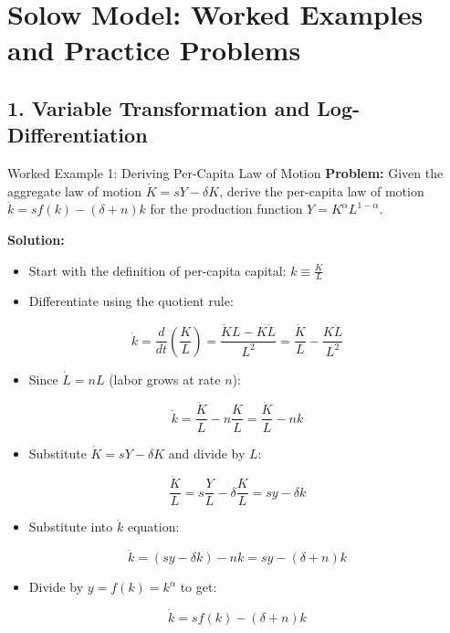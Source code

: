 \section{Solow Model: Worked Examples and Practice Problems}

\subsection{1. Variable Transformation and Log-Differentiation}

\begin{frame}{Worked Example 1: Deriving Per-Capita Law of Motion}
\textbf{Problem:} Given the aggregate law of motion $\dot{K} = sY - \delta K$, derive the per-capita law of motion $\dot{k} = sf(k) - (\delta + n)k$ for the production function $Y = K^\alpha L^{1-\alpha}$.

\bigskip
\textbf{Solution:}

\begin{itemize}
\item Start with the definition of per-capita capital: $k \equiv \frac{K}{L}$
\item Differentiate using the quotient rule:
\end{itemize}

\[
\dot{k} = \frac{d}{dt}\left(\frac{K}{L}\right) = \frac{\dot{K}L - K\dot{L}}{L^2} = \frac{\dot{K}}{L} - \frac{K\dot{L}}{L^2}
\]

\begin{itemize}
\item Since $\dot{L} = nL$ (labor grows at rate $n$):
\end{itemize}

\[
\dot{k} = \frac{\dot{K}}{L} - n\frac{K}{L} = \frac{\dot{K}}{L} - nk
\]

\begin{itemize}
\item Substitute $\dot{K} = sY - \delta K$ and divide by $L$:
\end{itemize}

\[
\frac{\dot{K}}{L} = s\frac{Y}{L} - \delta\frac{K}{L} = sy - \delta k
\]

\begin{itemize}
\item Substitute into $\dot{k}$ equation:
\end{itemize}

\[
\dot{k} = (sy - \delta k) - nk = sy - (\delta + n)k
\]

\begin{itemize}
\item Divide by $y = f(k) = k^\alpha$ to get:
\end{itemize}

\[
\boxed{\dot{k} = sf(k) - (\delta + n)k}
\]

\end{frame}

